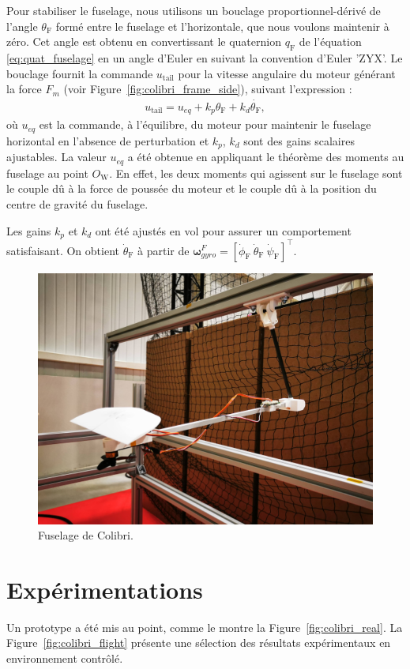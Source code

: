 Pour stabiliser le fuselage, nous utilisons un bouclage proportionnel-dérivé de l'angle $\theta_{\text{F}}$ formé entre le fuselage et l'horizontale, que nous voulons maintenir à zéro. Cet angle est obtenu en convertissant le quaternion $q_{\text{F}}$ de l'équation \eqref{eq:quat_fuselage} en un angle d'Euler en suivant la convention d'Euler 'ZYX'. Le bouclage fournit la commande $u_{\text{tail}}$ pour la vitesse angulaire du moteur générant la force $F_{m}$ (voir Figure~\ref{fig:colibri_frame_side}), suivant l'expression :
\begin{align*}
    u_{\text{tail}} = u_{eq} + k_{p} \theta_{\text{F}} + k_{d} \dot{\theta_{\text{F}}},
\end{align*}
où $u_{eq}$ est la commande, à l'équilibre, du moteur pour maintenir le fuselage horizontal en l'absence de perturbation et $k_{p}$, $k_{d}$ sont des gains scalaires ajustables. La valeur $u_{eq}$ a été obtenue en appliquant le théorème des moments au fuselage au point $O_{\text{W}}$. En effet, les deux moments qui agissent sur le fuselage sont le couple dû à la force de poussée du moteur et le couple dû à la position du centre de gravité du fuselage.

Les gains $k_{p}$ et $k_{d}$ ont été ajustés en vol pour assurer un comportement satisfaisant. On obtient $\dot{\theta}_{\text{F}}$ à partir de $\boldsymbol{\omega}_{gyro}^{F} = [\dot{\phi}_{\text{F}}~\dot{\theta}_{\text{F}}~\dot{\psi}_{\text{F}}]^\top$.


\begin{figure}[ht!]
    \centering
    \includegraphics[trim={0 15cm 0 25cm},clip, width=0.6\columnwidth]{figures/IMG_20230120_141852.jpg}
    \caption{Fuselage de Colibri.}
    \label{fig:colibri_fus}
\end{figure}




\section{Expérimentations}
\label{sec:exp}
Un prototype a été mis au point, comme le montre la Figure~\ref{fig:colibri_real}. La Figure~\ref{fig:colibri_flight} présente une sélection des résultats expérimentaux en environnement contrôlé.


